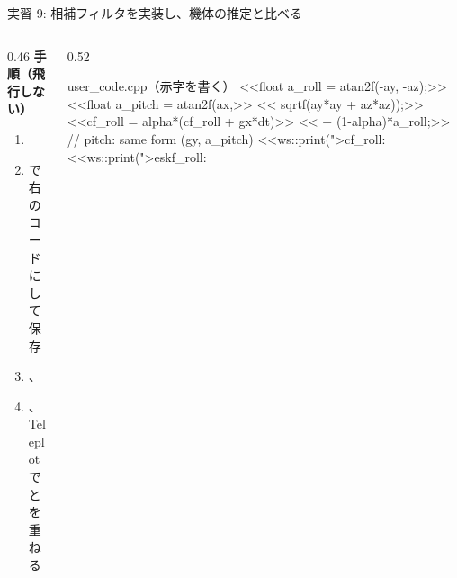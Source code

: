 \begin{frame}[fragile]{実習 9: 相補フィルタを実装し、機体の推定と比べる}
  \begin{columns}[T]
    \begin{column}{0.46\textwidth}
      {\footnotesize\textbf{\textcolor{sfblue}{手順（飛行しない）}}}\par\vspace{-2pt}
        \footnotesize
        \begin{enumerate}\setlength{\itemsep}{0pt}
          \item {}
          \item {} で右のコードにして保存
          \item {}、
          \item {}、Teleplot で  と  を重ねる
        \end{enumerate}
    \end{column}
    \begin{column}{0.52\textwidth}
      \begin{sflisting}[basicstyle=\ttfamily\scriptsize, moredelim={[is][\bfseries\color{sfred}]{<<}{>>}}]{user\_code.cpp（赤字を書く）}
<<float a_roll = atan2f(-ay, -az);>>
<<float a_pitch = atan2f(ax,>>
<<    sqrtf(ay*ay + az*az));>>
<<cf_roll = alpha*(cf_roll + gx*dt)>>
<<         + (1-alpha)*a_roll;>>
// pitch: same form (gy, a_pitch)
<<ws::print(">cf_roll:%
<<ws::print(">eskf_roll:%
      \end{sflisting}
    \end{column}
  \end{columns}
\end{frame}
